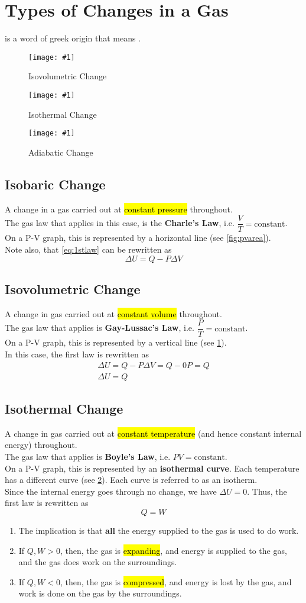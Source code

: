 \documentclass[a4paper,12pt]{article}
\let\oldsection\section
\renewcommand\section{\clearpage\oldsection}
\newcommand{\lb}{\\[8pt]}
\newcommand{\img}[4]{\begin{center}
  \begin{figure}[H]
    \centering
    \texttt{[image: \#1]}
    \caption{#3}
    \label{fig:#4}
  \end{figure}
\end{center}}
\newcommand{\tripleimg}[9]{
  \begin{minipage}{0.3\textwidth}
    \img{#1}{1}{#2}{#3}
  \end{minipage}%
  \hspace*{0.05\textwidth}%
  \begin{minipage}{0.3\textwidth}
    \img{#4}{1}{#5}{#6}
  \end{minipage}%
  \hspace*{0.05\textwidth}%
  \begin{minipage}{0.3\textwidth}
    \img{#7}{1}{#8}{#9}
  \end{minipage}%
}
\begin{document}
\section{Types of Changes in a Gas}

 is a word of greek origin that means .


\tripleimg %
{isovolumetric.png}{Isovolumetric Change}{isovolumetric}%
{isothermal.png}{Isothermal Change}{isothermal}%
{adiabatic.png}{Adiabatic Change}{adiabatic}


\subsection{Isobaric Change}

A change in a gas carried out at \hl{constant pressure} throughout.\lb
The gas law that applies in this case, is the \textbf{Charle's Law}, i.e. $\dfrac{V}{T} = \text{constant}$.\lb
On a P-V graph, this is represented by a horizontal line (see \cref{fig:pvarea}).\lb
Note also, that \cref{eq:1stlaw} can be rewritten as
$$\Delta U = Q - P\Delta V$$

\pagebreak

\subsection{Isovolumetric Change}

A change in gas carried out at \hl{constant volume} throughout.\lb
The gas law that applies is \textbf{Gay-Lussac's Law}, i.e. $\dfrac{P}{T} = \text{constant}$.\lb
On a P-V graph, this is represented by a vertical line (see \cref{fig:isovolumetric}).\lb
In this case, the first law is rewritten as
\begin{align*}
  \Delta U = Q - P\Delta V = Q - 0P = Q \\
  \Delta U = Q
\end{align*}

\subsection{Isothermal Change}

A change in gas carried out at \hl{constant temperature} (and hence constant internal energy) throughout.\lb
The gas law that applies is \textbf{Boyle's Law}, i.e. $PV = \text{constant}$.\lb
On a P-V graph, this is represented by an \textbf{isothermal curve}. Each temperature has a different curve (see \cref{fig:isothermal}). Each curve is referred to as an isotherm.\lb
Since the internal energy goes through no change, we have $\Delta U = 0$. Thus, the first law is rewritten as
$$Q = W$$
\begin{enumerate}
  \item The implication is that \textbf{all} the energy supplied to the gas is used to do work.
  \item If $Q, W > 0$, then, the gas is \hl{expanding}, and energy is supplied to the gas, and the gas does work on the surroundings.
  \item If $Q, W < 0$, then, the gas is \hl{compressed}, and energy is lost by the gas, and work is done on the gas by the surroundings.
\end{enumerate}
\end{document}
